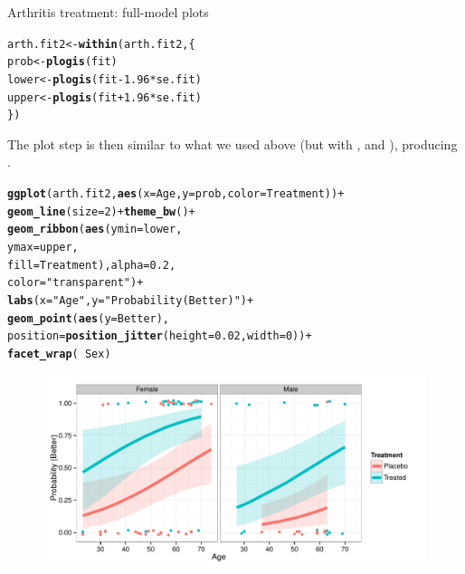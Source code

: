 \documentclass[11pt]{book}\usepackage[]{graphicx}\usepackage[]{color}
\makeatletter
\newcommand{\hlnum}[1]{\textcolor[rgb]{0.686,0.059,0.569}{#1}}%
\newcommand{\hlstr}[1]{\textcolor[rgb]{0.192,0.494,0.8}{#1}}%
\newcommand{\hlopt}[1]{\textcolor[rgb]{0,0,0}{#1}}%
\newcommand{\hlstd}[1]{\textcolor[rgb]{0.345,0.345,0.345}{#1}}%
\newcommand{\hlkwb}[1]{\textcolor[rgb]{0.69,0.353,0.396}{#1}}%
\newcommand{\hlkwc}[1]{\textcolor[rgb]{0.333,0.667,0.333}{#1}}%
\newcommand{\hlkwd}[1]{\textcolor[rgb]{0.737,0.353,0.396}{\textbf{#1}}}%
\newenvironment{kframe}{%
 \def\at@end@of@kframe{}%
 \ifinner\ifhmode%
  \def\at@end@of@kframe{\end{minipage}}%
  \begin{minipage}{\columnwidth}%
 \fi\fi%
 \def\FrameCommand##1{\hskip\@totalleftmargin \hskip-\fboxsep
 \colorbox{shadecolor}{##1}\hskip-\fboxsep
     \hskip-\linewidth \hskip-\@totalleftmargin \hskip\columnwidth}%
 \MakeFramed {\advance\hsize-\width
   \@totalleftmargin\z@ \linewidth\hsize
   \@setminipage}}%
 {\par\unskip\endMakeFramed%
 \at@end@of@kframe}
\newenvironment{knitrout}{}{} %
\renewenvironment{knitrout}{\small\renewcommand{\baselinestretch}{.85}}{} %
\makeatother
\begin{document}
\begin{Example}{Arthritis treatment: full-model plots}
\begin{knitrout}
\color{fgcolor}\begin{kframe}
\begin{alltt}
\hlstd{arth.fit2} \hlkwb{<-} \hlkwd{within}\hlstd{(arth.fit2, \{}
             \hlstd{prob}  \hlkwb{<-} \hlkwd{plogis}\hlstd{(fit)}
             \hlstd{lower} \hlkwb{<-} \hlkwd{plogis}\hlstd{(fit} \hlopt{-} \hlnum{1.96} \hlopt{*} \hlstd{se.fit)}
             \hlstd{upper} \hlkwb{<-} \hlkwd{plogis}\hlstd{(fit} \hlopt{+} \hlnum{1.96} \hlopt{*} \hlstd{se.fit)}
             \hlstd{\})}
\end{alltt}
\end{kframe}
\end{knitrout}
The plot step is then similar to what we used above (but with ,  and ), producing .
\begin{knitrout}
\color{fgcolor}\begin{kframe}
\begin{alltt}
\hlkwd{ggplot}\hlstd{( arth.fit2,} \hlkwd{aes}\hlstd{(}\hlkwc{x}\hlstd{=Age,} \hlkwc{y}\hlstd{=prob,} \hlkwc{color}\hlstd{=Treatment))} \hlopt{+}
  \hlkwd{geom_line}\hlstd{(}\hlkwc{size} \hlstd{=} \hlnum{2}\hlstd{)} \hlopt{+} \hlkwd{theme_bw}\hlstd{()} \hlopt{+}
  \hlkwd{geom_ribbon}\hlstd{(}\hlkwd{aes}\hlstd{(}\hlkwc{ymin} \hlstd{= lower,}
                  \hlkwc{ymax} \hlstd{= upper,}
                  \hlkwc{fill} \hlstd{= Treatment),} \hlkwc{alpha} \hlstd{=} \hlnum{0.2}\hlstd{,}
              \hlkwc{color} \hlstd{=} \hlstr{"transparent"}\hlstd{)} \hlopt{+}
  \hlkwd{labs}\hlstd{(}\hlkwc{x} \hlstd{=} \hlstr{"Age"}\hlstd{,} \hlkwc{y} \hlstd{=} \hlstr{"Probability (Better)"}\hlstd{)} \hlopt{+}
  \hlkwd{geom_point}\hlstd{(}\hlkwd{aes}\hlstd{(}\hlkwc{y}\hlstd{=Better),}
             \hlkwc{position}\hlstd{=}\hlkwd{position_jitter}\hlstd{(}\hlkwc{height}\hlstd{=}\hlnum{0.02}\hlstd{,} \hlkwc{width}\hlstd{=}\hlnum{0}\hlstd{))} \hlopt{+}
  \hlkwd{facet_wrap}\hlstd{(}\hlopt{~} \hlstd{Sex)}
\end{alltt}
\end{kframe}\begin{figure}[!htbp]


\centerline{\includegraphics[width=.8\textwidth,clip]{ch07/fig/arth-full2-1} }


\end{figure}
\end{knitrout}
\end{Example}
\end{document}
